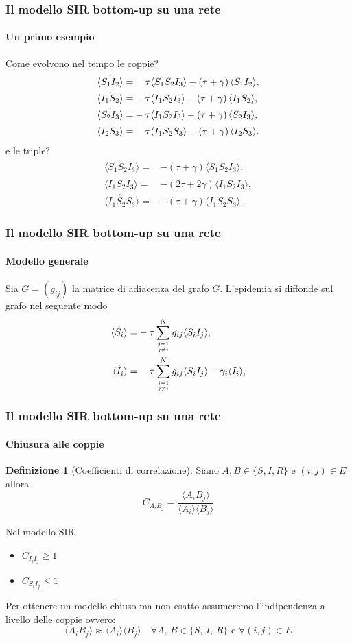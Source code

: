 \documentclass{beamer}
\newcommand{\spa}{\mathbin{\textcolor{white}{-}}}
\newcommand{\angol}[1]{\langle #1 \rangle}
\newcommand{\tonde}[1]{\left( #1 \right)}
\theoremstyle{definition}
\newtheorem{defn}{Definizione}
\theoremstyle{plain}
\begin{document}
\begin{frame}
\frametitle{Il modello SIR bottom-up su una rete}
\framesubtitle{Un primo esempio}
Come evolvono nel tempo le coppie?
    \begin{equation*}
\begin{aligned}
	\dot{\angol{S_1I_2}}=&\spa\tau\angol{S_1S_2I_3} - \tonde{ \tau + \gamma}\angol{S_1 I_2},
\\
	\dot{\angol{I_1S_2}}=&-\tau\angol{I_1S_2I_3} - \tonde{ \tau + \gamma}\angol{I_1 S_2},
\\
	\dot{\angol{S_2I_3}}=&-\tau\angol{I_1S_2I_3} - \tonde{ \tau + \gamma}\angol{S_2 I_3},
\\
	\dot{\angol{I_2S_3}}=&\spa\tau\angol{I_1S_2S_3} - \tonde{ \tau + \gamma}\angol{I_2 S_3}.
	\end{aligned}
\end{equation*}
\pause
e le triple?
\begin{equation*}
    \begin{aligned}
        	\dot{\angol{S_1S_2I_3}}=&-\tonde{\tau + \gamma}\angol{S_1S_2I_3},
\\
	\dot{\angol{I_1S_2I_3}}=&-\tonde{2\tau + 2\gamma}\angol{I_1S_2I_3},
\\
	\dot{\angol{I_1S_2S_3}}=&-\tonde{\tau + \gamma}\angol{I_1S_2S_3}.
 \end{aligned}
\end{equation*}
\end{frame}
\begin{frame}
      \frametitle{Il modello SIR bottom-up su una rete}
\framesubtitle{Modello generale}
Sia $G = \left( g_{ij}\right)$ la \alert{ matrice di adiacenza} del grafo $G$. L'epidemia si diffonde sul grafo nel seguente modo 
\begin{equation*}
\begin{aligned}
	 \dot{\angol{ S_i}}=& - \tau \sum_{j=1\atop{j\neq i }}^N g_{ij} \angol{ S_i I_j},\\
	 \dot{\angol{I_i}} =&\spa \tau \sum_{j=1\atop{j\neq i}}^N  g_{ij} \angol{ S_i I_j} -\gamma_i \angol{I_i},
\end{aligned}
\end{equation*}
\end{frame}
\begin{frame}
\frametitle{Il modello SIR bottom-up su una rete}
\framesubtitle{Chiusura alle coppie}
\begin{defn}[Coefficienti di correlazione]
Siano $A,B \in \{ S, I, R\}$ e $(i,j)\in E $ allora 
$$ C_{A_i B_j} = \frac{ \angol{ A_i B_j}}{\angol{A_i} \angol{B_j}} $$ 
\end{defn}
\pause
Nel modello SIR 
\begin{itemize}
\item $C_{I_i I_j} \geq 1 $ 
\item $C_{S_iI_j}\leq 1 $ 
\end{itemize}
\pause
Per ottenere un modello chiuso ma \alert{non esatto} assumeremo l'indipendenza a livello delle coppie ovvero:
$$ \angol{ A_i B_j } \approx \angol{ A_i }\angol{B_j} \quad \forall A, \, B \in \{ S, \, I,\, R\} \text{ e } \forall (i,j) \in E $$

\end{frame}
\end{document}
